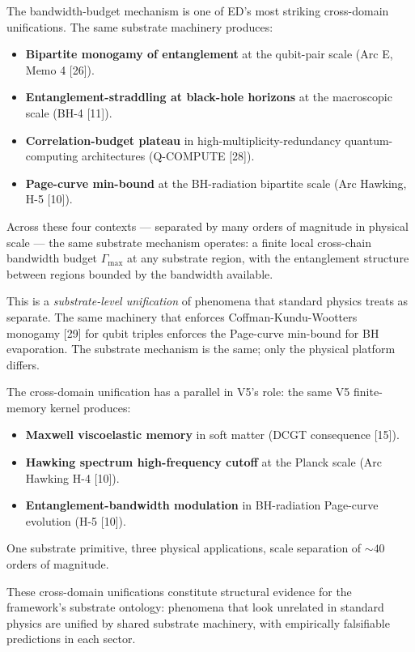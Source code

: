 \documentclass[11pt,a4paper]{article}
\begin{document}
The bandwidth-budget mechanism is one of ED's most striking cross-domain unifications. The same substrate machinery produces:

\begin{itemize}[noitemsep]
  \item \textbf{Bipartite monogamy of entanglement} at the qubit-pair scale (Arc E, Memo 4 [26]).
  \item \textbf{Entanglement-straddling at black-hole horizons} at the macroscopic scale (BH-4 [11]).
  \item \textbf{Correlation-budget plateau} in high-multiplicity-redundancy quantum-computing architectures (Q-COMPUTE [28]).
  \item \textbf{Page-curve min-bound} at the BH-radiation bipartite scale (Arc Hawking, H-5 [10]).
\end{itemize}

Across these four contexts --- separated by many orders of magnitude in physical scale --- the same substrate mechanism operates: a finite local cross-chain bandwidth budget $\Gamma_{\mathrm{max}}$ at any substrate region, with the entanglement structure between regions bounded by the bandwidth available.

This is a \emph{substrate-level unification} of phenomena that standard physics treats as separate. The same machinery that enforces Coffman-Kundu-Wootters monogamy [29] for qubit triples enforces the Page-curve min-bound for BH evaporation. The substrate mechanism is the same; only the physical platform differs.

The cross-domain unification has a parallel in V5's role: the same V5 finite-memory kernel produces:

\begin{itemize}[noitemsep]
  \item \textbf{Maxwell viscoelastic memory} in soft matter (DCGT consequence [15]).
  \item \textbf{Hawking spectrum high-frequency cutoff} at the Planck scale (Arc Hawking H-4 [10]).
  \item \textbf{Entanglement-bandwidth modulation} in BH-radiation Page-curve evolution (H-5 [10]).
\end{itemize}

One substrate primitive, three physical applications, scale separation of $\sim 40$ orders of magnitude.

These cross-domain unifications constitute structural evidence for the framework's substrate ontology: phenomena that look unrelated in standard physics are unified by shared substrate machinery, with empirically falsifiable predictions in each sector.
\end{document}
